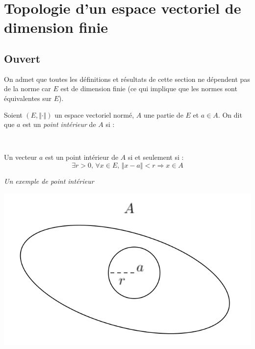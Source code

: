 \documentclass[french,11pt,twoside]{VcCours}
\begin{document}
\section{Topologie d'un espace vectoriel de dimension finie}

\subsection{Ouvert}

\begin{Theoreme}{} On admet que toutes les définitions et résultats de cette section ne dépendent pas de la norme car $E$ est de dimension finie (ce qui implique que les normes sont équivalentes sur $E$).
\end{Theoreme}

\begin{Definition}{} Soient $(E, \Vert \cdot \Vert)$ un espace vectoriel normé, $A$ une partie de $E$ et $a \in A$. On dit que $a$ est un \emph{point intérieur} de $A$ si :

\vspace*{1cm}~
\end{Definition}

\begin{Remarque}{} Un vecteur $a$ est un point intérieur de $A$ si et seulement si :
$$ \exists r>0, \, \forall x \in E, \, \Vert x-a \Vert < r \Rightarrow x \in A$$
\end{Remarque}

\begin{center}
\emph{Un exemple de point intérieur}

\includegraphics[scale=0.45]{Ouvert}
\end{center}
\end{document}
